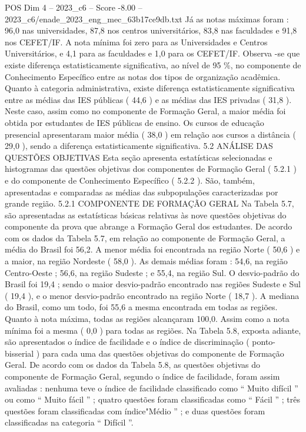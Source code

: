 \begin{textsample}{POS Dim 4 – 2023\_c6 – Score -8.00 – 2023\_c6/enade\_2023\_eng\_mec\_63b17ce9db.txt}
Já as notas máximas foram : 96,0 nas universidades, 87,8 nos centros universitários, 83,8 nas faculdades e 91,8 nos CEFET/IF.
A nota mínima foi zero para as Universidades e Centros Universitários, e 4,1 para as faculdades e 1,0 para os CEFET/IF.
Observa -se que existe diferença estatisticamente significativa, ao nível de 95 \%, no componente de Conhecimento Específico entre as notas dos tipos de organização acadêmica.
Quanto à categoria administrativa, existe diferença estatisticamente significativa entre as médias das IES públicas ( 44,6 ) e as médias das IES privadas ( 31,8 ).
Neste caso, assim como no componente de Formação Geral, a maior média foi obtida por estudantes de IES públicas de ensino.
Os cursos de educação presencial apresentaram maior média ( 38,0 ) em relação aos cursos a distância ( 29,0 ), sendo a diferença estatisticamente significativa. 5.2 ANÁLISE DAS QUESTÕES OBJETIVAS Esta seção apresenta estatísticas selecionadas e histogramas das questões objetivas dos componentes de Formação Geral ( 5.2.1 ) e do componente de Conhecimento Específico ( 5.2.2 ).
São, também, apresentadas e comparadas as médias das subpopulações caracterizadas por grande região. 5.2.1 COMPONENTE DE FORMAÇÃO GERAL Na Tabela 5.7, são apresentadas as estatísticas básicas relativas às nove questões objetivas do componente da prova que abrange a Formação Geral dos estudantes.
De acordo com os dados da Tabela 5.7, em relação ao componente de Formação Geral, a média do Brasil foi 56,2.
A menor média foi encontrada na região Norte ( 50,6 ) e a maior, na região Nordeste ( 58,0 ).
As demais médias foram : 54,6, na região Centro-Oeste ; 56,6, na região Sudeste ; e 55,4, na região Sul.
O desvio-padrão do Brasil foi 19,4 ; sendo o maior desvio-padrão encontrado nas regiões Sudeste e Sul ( 19,4 ), e o menor desvio-padrão encontrado na região Norte ( 18,7 ).
A mediana do Brasil, como um todo, foi 55,6 a mesma encontrada em todas as regiões.
Quanto à nota máxima, todas as regiões alcançaram 100,0.
Assim como a nota mínima foi a mesma ( 0,0 ) para todas as regiões.
Na Tabela 5.8, exposta adiante, são apresentados o índice de facilidade e o índice de discriminação ( ponto-bisserial ) para cada uma das questões objetivas do componente de Formação Geral.
De acordo com os dados da Tabela 5.8, as questões objetivas do componente de Formação Geral, segundo o índice de facilidade, foram assim avaliadas : nenhuma teve o índice de facilidade classificado como “ Muito difícil ” ou como “ Muito fácil ” ; quatro questões foram classificadas como “ Fácil ” ; três questões foram classificadas com índice"Médio ” ; e duas questões foram classificadas na categoria “ Difícil ”.

\end{textsample}
